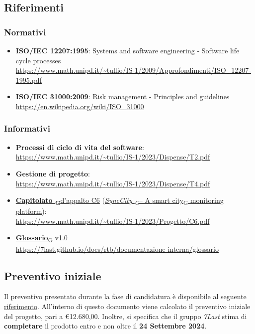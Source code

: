 \subsection{Riferimenti}
\subsubsection{Normativi} 
\begin{itemize}
	\item \textbf{ISO/IEC 12207:1995}: Systems and software engineering - Software life cycle processes \\\url{https://www.math.unipd.it/~tullio/IS-1/2009/Approfondimenti/ISO_12207-1995.pdf}
	\item \textbf{ISO/IEC 31000:2009}: Risk management - Principles and guidelines \\\url{https://en.wikipedia.org/wiki/ISO_31000}
\end{itemize}
\subsubsection{Informativi}
\begin{itemize}
	\item \textbf{Processi di ciclo di vita del software}: \\
	      \url{https://www.math.unipd.it/~tullio/IS-1/2023/Dispense/T2.pdf}
	\item \textbf{Gestione di progetto}: \\
	      \url{https://www.math.unipd.it/~tullio/IS-1/2023/Dispense/T4.pdf}
	\item \href{https://7last.github.io/docs/rtb/documentazione-interna/glossario\#capitolato}{\textbf{Capitolato \textsubscript{G}}d'appalto C6} (\href{https://7last.github.io/docs/rtb/documentazione-interna/glossario\#synccity}{\textit{SyncCity \textsubscript{G}}– A \href{https://7last.github.io/docs/rtb/documentazione-interna/glossario\#smart-city}{smart city\textsubscript{G}} monitoring platform}):\\
	      \url{https://www.math.unipd.it/~tullio/IS-1/2023/Progetto/C6.pdf}
	\item \href{https://7last.github.io/docs/rtb/documentazione-interna/glossario\#glossario}{\textbf{Glossario}\textsubscript{G}} v1.0\\
	      \url{https://7last.github.io/docs/rtb/documentazione-interna/glossario}
\end{itemize}

\subsection{Preventivo iniziale}
Il preventivo presentato durante la fase di candidatura è disponibile al seguente \uline{\href{https://7last.github.io/docs/candidatura/preventivo-costi-assunzione-impegni}{riferimento}}.
All'interno di questo documento viene calcolato il preventivo iniziale del progetto, pari a €12.680,00.
Inoltre, si specifica che il gruppo \textit{7Last} stima di \textbf{completare} il prodotto entro e non oltre il \textbf{24 Settembre 2024}.
